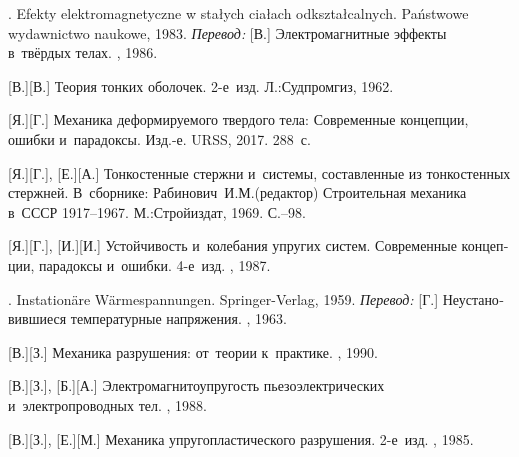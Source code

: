 \begin{thebibliography}{123}
\begin{otherlanguage}{russian}
. Efekty elektromagnetyczne w stałych ciałach od\-kształ\-cal\-nych. Państwowe wydawnictwo naukowe, 1983. 
\emph{Перевод:}
[В.] Электромагнитные эффекты в~твёрдых телах. \mirpublisher, 1986. 

[В.][В.] Теория тонких оболочек. 2\hbox{-}е~изд. Л.:\;Судпромгиз, 1962. 

[Я.][Г.] Механика деформируемого твердого тела: Современные концепции, ошибки и~парадоксы. Изд.\hbox{-}е. URSS, 2017. 288~с.

[Я.][Г.], [Е.][А.] Тонкостенные стержни и~системы, составленные из тонкостенных стержней. В~сборнике: Рабинович~И.\:М.\:(редактор) Строительная механика в~СССР 1917\hbox{--}1967. М.:\;Строй\-издат, 1969. С.\hbox{--}98.

[Я.][Г.], [И.][И.] Устойчивость и~колебания упругих систем. Современные концепции, парадоксы и~ошибки. 4\hbox{-}е~изд. \naukapublisher, 1987. 

. Instation\"{a}re W\"{a}rmespannungen. Springer\hbox{-}Verlag, 1959. 
\emph{Перевод:} [Г.] Неустановившиеся температурные напряжения. \fizmatgiz, 1963. 

[В.][З.] Механика разрушения: от~теории к~практике. \naukapublisher, 1990. 

[В.][З.], [Б.][А.] Электромагнитоупругость пьезоэлектрических и~электропроводных тел. \naukapublisher, 1988. 

[В.][З.], [Е.][М.] Механика упругопластического разрушения. 2\hbox{-}е~изд. \naukapublisher, 1985. 


\end{otherlanguage}
\end{thebibliography}
